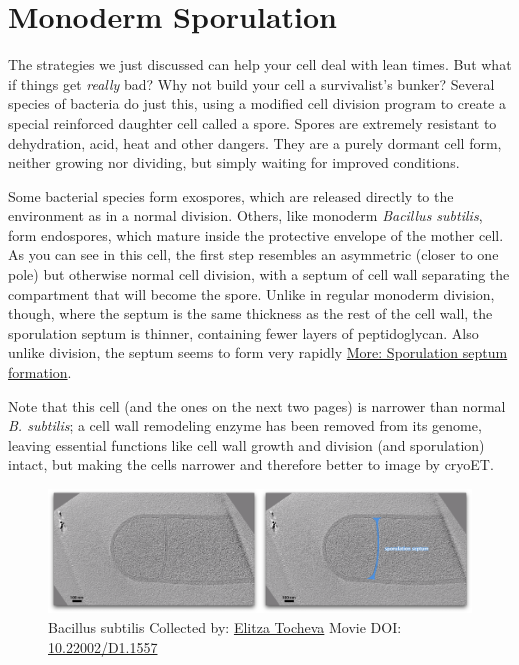 \documentclass[]{tufte-book}
\begin{document}
\section{Monoderm Sporulation}\label{monoderm-sporulation}

The strategies we just discussed can help your cell deal with lean
times. But what if things get \emph{really} bad? Why not build your cell
a survivalist's bunker? Several species of bacteria do just this, using
a modified cell division program to create a special reinforced daughter
cell called a spore. Spores are extremely resistant to dehydration,
acid, heat and other dangers. They are a purely dormant cell form,
neither growing nor dividing, but simply waiting for improved
conditions.

Some bacterial species form exospores, which are released directly to
the environment as in a normal division. Others, like monoderm
\emph{Bacillus subtilis}, form endospores, which mature inside the
protective envelope of the mother cell. As you can see in this cell, the
first step resembles an asymmetric (closer to one pole) but otherwise
normal cell division, with a septum of cell wall separating the
compartment that will become the spore. Unlike in regular monoderm
division, though, where the septum is the same thickness as the rest of
the cell wall, the sporulation septum is thinner, containing fewer
layers of peptidoglycan. Also unlike division, the septum seems to form
very rapidly \protect\hyperlink{Sporulation_septum_formation}{More:
Sporulation septum formation}.

Note that this cell (and the ones on the next two pages) is narrower
than normal \emph{B. subtilis}; a cell wall remodeling enzyme has been
removed from its genome, leaving essential functions like cell wall
growth and division (and sporulation) intact, but making the cells
narrower and therefore better to image by cryoET.





\begin{figure}
\includegraphics{movie_stills/8_5} \caption[Bacillus subtilis Collected by:
\protect\hyperlink{elitza_tocheva}{Elitza Tocheva} Movie DOI:
\href{https://doi.org/10.22002/D1.1557}{10.22002/D1.1557}]{Bacillus subtilis Collected by:
\protect\hyperlink{elitza_tocheva}{Elitza Tocheva} Movie DOI:
\href{https://doi.org/10.22002/D1.1557}{10.22002/D1.1557}}\label{fig:8-5}
\end{figure}
\end{document}
